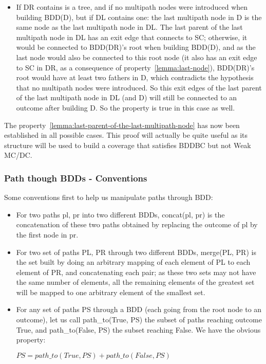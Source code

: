 \documentclass[a4paper,12pt,twoside]{article}
\begin{document}
\begin{itemize}
\begin{itemize}
  \item If DR contains is a tree, and if no multipath nodes were introduced
    when building BDD(D), but if DL contains one: the last
    multipath node in D is the same node as the last multipath node in DL.
    The last parent of the last multipath node in DL has an exit edge that
    connects to SC; otherwise, it would be connected to BDD(DR)'s root
    when building BDD(D), and as the last node would also be connected
    to this root node (it also has an exit edge to SC in DR, as a
    consequence of property~\ref{lemma:last-node}), BDD(DR)'s root
    would have at least two fathers in D, which contradicts the
    hypothesis that no multipath nodes were introduced. So this exit edges of
    the last parent of the last multipath node in DL (and D) will still be
    connected to an outcome after building D. So the property is true
    in this case as well.
  \end{itemize}
\end{itemize}

The property~\ref{lemma:last-parent-of-the-last-multipath-node} has now been
established in all possible cases. This proof will actually be quite
useful as its structure will be used to build a coverage that satisfies
BDDBC but not Weak MC/DC.

\subsubsection{Path though BDDs - Conventions}

Some conventions first to help us manipulate paths through BDD:

\begin{itemize}
\item For two paths pl, pr into two different BDDs,
  concat(pl, pr) is the concatenation of these two paths obtained by replacing
  the outcome of pl by the first node in pr.

\item For two set of paths PL, PR through two different BDDs, merge(PL, PR)
  is the set built by doing an arbitrary mapping of each element
  of PL to each element of PR, and concatenating each pair; as these
  two sets may not have the same number of elements, all the remaining
  elements of the greatest set will be mapped to one arbitrary element
  of the smallest set.

\item For any set of paths PS through a BDD (each going from the root node to
  an outcome), let us call path\_to(True, PS) the subset of paths reaching
  outcome True, and path\_to(False, PS) the subset reaching False. We have
  the obvious property:

  $PS = path\_to(True, PS) + path\_to(False, PS)$
\end{itemize}
\end{document}

